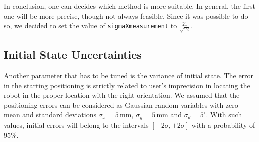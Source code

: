 %
%

In conclusion, one can decides which method is more suitable. In general, the first one will be more precise, though not always feasible. Since it was possible to do so, we decided to set the value of \texttt{sigmaXmeasurement} to $\frac{21}{\sqrt{12}}$.



\subsection{Initial State Uncertainties}

Another parameter that has to be tuned is the variance of initial state. The error in the starting positioning is strictly related to user's imprecision in locating the robot in the proper location with the right orientation. We assumed that the positioning errors can be considered as Gaussian random variables with zero mean and standard deviations $\sigma_x = 5\,\textrm{mm}$, $\sigma_y = 5\,\textrm{mm}$ and $\sigma_\theta = 5^\circ$. With such values, initial errors will belong to the intervals $[-2\sigma,+2\sigma]$ with a probability of 95\%.





